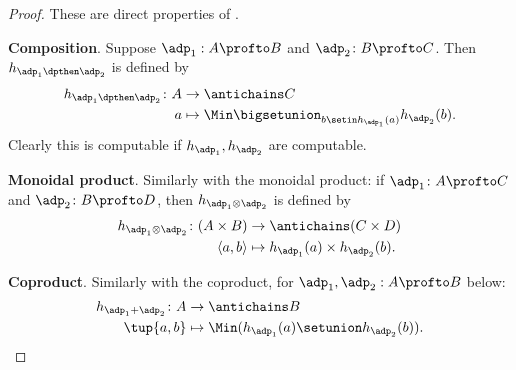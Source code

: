 \begin{proof}
    These are direct properties of \DP.


    \textbf{Composition}.
    Suppose $\adp_1 : A \profto B$ and $\adp_2 \colon B \profto C$.
    Then $h_{\adp_1\dpthen \adp_2} $ is defined by
    \begin{equation}
        \begin{aligned}
            h_{\adp_1 \dpthen \adp_2} \colon A & \to \antichains C \\
            a                                  & \mapsto \Min \bigsetunion_{b \setin h_{\adp_1}(a)} h_{\adp_2}(b).
        \end{aligned}
    \end{equation}
    Clearly this is computable if $h_{\adp_1}, h_{\adp_2}$ are computable.


    \textbf{Monoidal product}.
    Similarly with the monoidal product: if $\adp_1 \colon A \profto C$ and $\adp_2 \colon B \profto D$, then $h_{\adp_1 \otimes \adp_2}$ is defined by
    \begin{equation}
        \begin{aligned}
            h_{\adp_1 \otimes \adp_2} \colon (A \times B) & \to \antichains (C \times D) \\
            \langle a, b \rangle                          & \mapsto h_{\adp_1}(a) \times h_{\adp_2}(b).
        \end{aligned}
    \end{equation}

    \textbf{Coproduct}.
    Similarly with the coproduct, for $\adp_1, \adp_2 : A \profto B$ below:
    \begin{equation}
        \begin{aligned}
            h_{\adp_1 + \adp_2} \colon  A & \to \antichains B \\
            \tup{a,b}                     & \mapsto \Min (h_{\adp_1}(a) \setunion h_{\adp_2}(b)).
        \end{aligned}
    \end{equation}

\end{proof}

